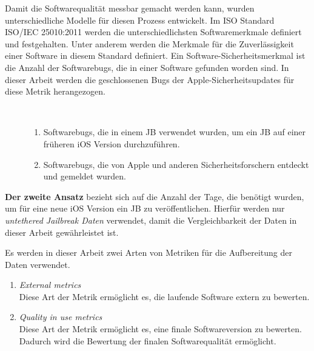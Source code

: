 Damit die Softwarequalität messbar gemacht werden kann, wurden unterschiedliche Modelle für diesen Prozess entwickelt. Im ISO Standard ISO/IEC 25010:2011 werden die unterschiedlichsten Softwaremerkmale definiert und festgehalten. \cite{IOS25010} Unter anderem werden die Merkmale für die Zuverlässigkeit einer Software in diesem Standard definiert. Ein Software-Sicherheitsmerkmal ist die Anzahl der Softwarebugs, die in einer Software gefunden worden sind. In dieser Arbeit werden die geschlossenen Bugs der Apple-Sicherheitsupdates für diese Metrik herangezogen.
\begin{description}
    \item[\parbox{\textwidth} {In dieser Arbeit werden zwei Arten von Bugs unterschieden, die in den iOS Sicherheitsupdates geschlossen werden}]~\par
    \begin{enumerate}
        \item Softwarebugs, die in einem JB verwendet wurden, um ein JB auf einer früheren iOS Version durchzuführen. 
        \item Softwarebugs, die von Apple und anderen Sicherheitsforschern entdeckt und gemeldet wurden.
    \end{enumerate}
\end{description} 
 \par
\textbf{Der zweite Ansatz} bezieht sich auf die Anzahl der Tage, die benötigt wurden, um für eine neue iOS Version ein JB zu veröffentlichen. Hierfür werden nur \textit{\glqq untethered Jailbreak Daten\grqq{}} verwendet, damit die Vergleichbarkeit der Daten in dieser Arbeit gewährleistet ist.\par 
Es werden in dieser Arbeit zwei Arten von Metriken für die Aufbereitung der Daten verwendet.
\begin{enumerate}
    \item \textit{\glqq External metrics\grqq{}}\\
    Diese Art der Metrik ermöglicht es, die laufende Software extern zu bewerten.
    \item \textit{\glqq Quality in use metrics\grqq{}} \\
    Diese Art der Metrik ermöglicht es, eine finale Softwareversion zu bewerten. Dadurch wird die Bewertung der finalen Softwarequalität ermöglicht.
\end{enumerate}



